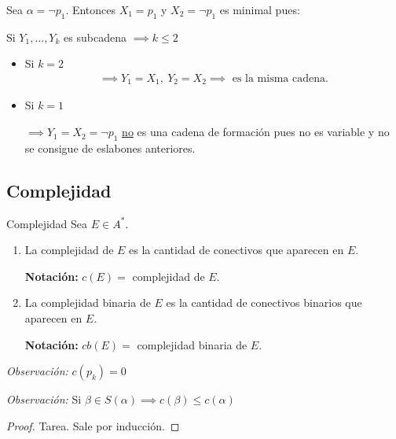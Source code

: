 Sea $\alpha = \neg p_1$. Entonces $X_1 = p_1$ y $X_2 = \neg p_1$ es minimal 
pues:

Si $Y_1, \dotsc, Y_k$ es subcadena $\implies k \leq 2$ 
%
\begin{itemize}
    \item Si $k = 2$
        \begin{gather*}
            \implies Y_1 = X_1, ~ Y_2 = X_2 
            \implies \text{ es la misma cadena.}
        \end{gather*}
    \item Si $k = 1$
        
        $\implies Y_1 = X_2 = \neg p_1$ 
        \underline{no} es una cadena de formación pues no es variable 
        y no se consigue de eslabones anteriores.
\end{itemize}



\subsection{Complejidad}

\begin{definicion}{Complejidad}{}
    Sea $E \in A^{*}$.

    \medskip

    \begin{enumerate}
        \item La complejidad de $E$ es la cantidad de conectivos que 
            aparecen en $E$.

            \bigskip
            \textbf{Notación:} \phantom{b}$c(E) =$ complejidad de $E$.
        \item La complejidad binaria de $E$ es la cantidad de conectivos
            binarios que aparecen en $E$.

            \bigskip
            \textbf{Notación:} $cb(E) =$ complejidad binaria de $E$.
    \end{enumerate}
\end{definicion}

\bigskip
\textit{Observación:}
$c(p_k) = 0$

\bigskip
\textit{Observación:}
%
Si $\beta \in S(\alpha) \implies c(\beta) \leq c(\alpha)$

\begin{proof}
    Tarea. Sale por inducción.
\end{proof}

